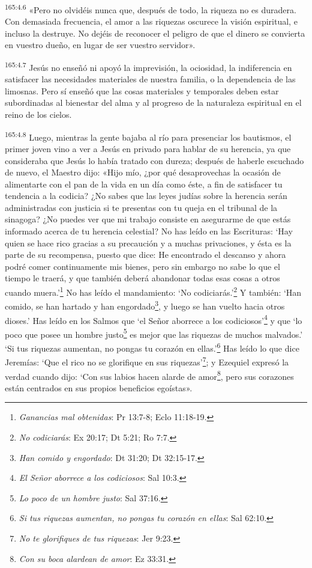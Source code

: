 \par 
\textsuperscript{165:4.6} «Pero no olvidéis nunca que, después de todo, la riqueza no es duradera. Con demasiada frecuencia, el amor a las riquezas oscurece la visión espiritual, e incluso la destruye. No dejéis de reconocer el peligro de que el dinero se convierta en vuestro dueño, en lugar de ser vuestro servidor».

\par 
\textsuperscript{165:4.7} Jesús no enseñó ni apoyó la imprevisión, la ociosidad, la indiferencia en satisfacer las necesidades materiales de nuestra familia, o la dependencia de las limosnas. Pero sí enseñó que las cosas materiales y temporales deben estar subordinadas al bienestar del alma y al progreso de la naturaleza espiritual en el reino de los cielos.

\par 
\textsuperscript{165:4.8} Luego, mientras la gente bajaba al río para presenciar los bautismos, el primer joven vino a ver a Jesús en privado para hablar de su herencia, ya que consideraba que Jesús lo había tratado con dureza; después de haberle escuchado de nuevo, el Maestro dijo: «Hijo mío, ¿por qué desaprovechas la ocasión de alimentarte con el pan de la vida en un día como éste, a fin de satisfacer tu tendencia a la codicia? ¿No sabes que las leyes judías sobre la herencia serán administradas con justicia si te presentas con tu queja en el tribunal de la sinagoga? ¿No puedes ver que mi trabajo consiste en asegurarme de que estás informado acerca de tu herencia celestial? No has leído en las Escrituras: `Hay quien se hace rico gracias a su precaución y a muchas privaciones, y ésta es la parte de su recompensa, puesto que dice: He encontrado el descanso y ahora podré comer continuamente mis bienes, pero sin embargo no sabe lo que el tiempo le traerá, y que también deberá abandonar todas esas cosas a otros cuando muera.'\footnote{\textit{Ganancias mal obtenidas}: Pr 13:7-8; Eclo 11:18-19.} No has leído el mandamiento: `No codiciarás.'\footnote{\textit{No codiciarás}: Ex 20:17; Dt 5:21; Ro 7:7.} Y también: `Han comido, se han hartado y han engordado\footnote{\textit{Han comido y engordado}: Dt 31:20; Dt 32:15-17.}, y luego se han vuelto hacia otros dioses.' Has leído en los Salmos que `el Señor aborrece a los codiciosos'\footnote{\textit{El Señor aborrece a los codiciosos}: Sal 10:3.} y que `lo poco que posee un hombre justo\footnote{\textit{Lo poco de un hombre justo}: Sal 37:16.} es mejor que las riquezas de muchos malvados.' `Si tus riquezas aumentan, no pongas tu corazón en ellas.'\footnote{\textit{Si tus riquezas aumentan, no pongas tu corazón en ellas}: Sal 62:10.} Has leído lo que dice Jeremías: `Que el rico no se glorifique en sus riquezas'\footnote{\textit{No te glorifiques de tus riquezas}: Jer 9:23.}; y Ezequiel expresó la verdad cuando dijo: `Con sus labios hacen alarde de amor\footnote{\textit{Con su boca alardean de amor}: Ez 33:31.}, pero sus corazones están centrados en sus propios beneficios egoístas».

